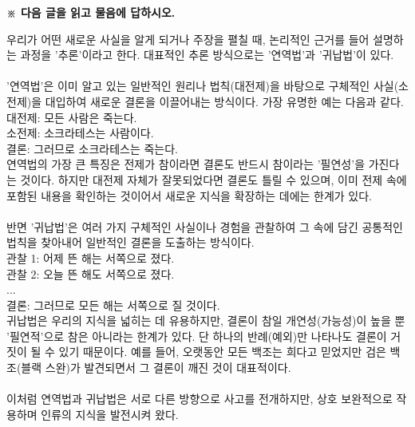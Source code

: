 \documentclass[11pt,a4paper]{article}
\begin{document}
\vspace{4mm}
{\small\textbf{※ 다음 글을 읽고 물음에 답하시오.}}
\vspace{2mm}
\begin{tcolorbox}[passage]
우리가 어떤 새로운 사실을 알게 되거나 주장을 펼칠 때, 논리적인 근거를 들어 설명하는 과정을 '추론'이라고 한다. 대표적인 추론 방식으로는 '연역법'과 '귀납법'이 있다. \\{}
\vspace{4pt} \\{}
'연역법'은 이미 알고 있는 일반적인 원리나 법칙(대전제)을 바탕으로 구체적인 사실(소전제)을 대입하여 새로운 결론을 이끌어내는 방식이다. 가장 유명한 예는 다음과 같다. \\{}
대전제: 모든 사람은 죽는다. \\{}
소전제: 소크라테스는 사람이다. \\{}
결론: 그러므로 소크라테스는 죽는다. \\{}
연역법의 가장 큰 특징은 전제가 참이라면 결론도 반드시 참이라는 '필연성'을 가진다는 것이다. 하지만 대전제 자체가 잘못되었다면 결론도 틀릴 수 있으며, 이미 전제 속에 포함된 내용을 확인하는 것이어서 새로운 지식을 확장하는 데에는 한계가 있다. \\{}
\vspace{4pt} \\{}
반면 '귀납법'은 여러 가지 구체적인 사실이나 경험을 관찰하여 그 속에 담긴 공통적인 법칙을 찾아내어 일반적인 결론을 도출하는 방식이다. \\{}
관찰 1: 어제 뜬 해는 서쪽으로 졌다. \\{}
관찰 2: 오늘 뜬 해도 서쪽으로 졌다. \\{}
... \\{}
결론: 그러므로 모든 해는 서쪽으로 질 것이다. \\{}
귀납법은 우리의 지식을 넓히는 데 유용하지만, 결론이 참일 개연성(가능성)이 높을 뿐 '필연적'으로 참은 아니라는 한계가 있다. 단 하나의 반례(예외)만 나타나도 결론이 거짓이 될 수 있기 때문이다. 예를 들어, 오랫동안 모든 백조는 희다고 믿었지만 검은 백조(블랙 스완)가 발견되면서 그 결론이 깨진 것이 대표적이다. \\{}
\vspace{4pt} \\{}
이처럼 연역법과 귀납법은 서로 다른 방향으로 사고를 전개하지만, 상호 보완적으로 작용하며 인류의 지식을 발전시켜 왔다.
\end{tcolorbox}
\vspace{3mm}
\end{document}
